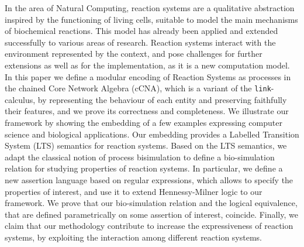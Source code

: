 
In the area of Natural Computing, reaction systems are
a qualitative abstraction inspired by the 
functioning of living cells, suitable to model the main
mechanisms of biochemical reactions.
This model has already been applied
and extended successfully to various areas of research. Reaction 
systems interact with the environment represented by the context, and
pose challenges for further extensions as well as
for the implementation, as it is a new computation model. 
In this paper {\color{red} we define a modular encoding of Reaction Systems as processes
in the chained Core Network Algebra (cCNA), which is a variant  of the  {\tt link}-calculus,
by representing the behaviour of each entity and
preserving faithfully their features, and we prove its correctness and completeness.}
We illustrate our framework by showing the embedding of 
a few examples expressing computer science
and biological applications. 
{\color{red}Our embedding provides a Labelled Transition System (LTS) semantics for reaction systems. Based on the LTS semantics, we adapt  the classical notion of  process bisimulation to define a bio-simulation relation for studying properties of reaction systems.}
In particular, we define a new assertion language based on regular expressions, 
which allows to specify the properties of interest, and use it to extend Hennessy-Milner logic
to our framework. 
{\color{red} We prove that our bio-simulation relation and the logical equivalence, that are defined parametrically on some assertion of interest, coincide.}
Finally, 
{\color{red} we claim that}
our methodology 
contribute to increase the expressiveness
of reaction systems, by exploiting the interaction among 
different reaction systems. 
